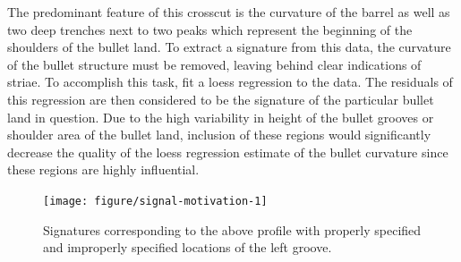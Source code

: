 \documentclass[12pt]{article}\usepackage[]{graphicx}\usepackage[]{color}
\newenvironment{knitrout}{}{} %
\theoremstyle{nonumberplain}
\begin{document}
The predominant feature of this crosscut is the curvature of the barrel as well as two deep trenches next to two peaks which represent the beginning of the shoulders of the bullet land. To extract a signature from this data, the curvature of the bullet structure must be removed, leaving behind clear indications of striae. To accomplish this task, \cite{hare2017} fit a loess regression to the data. The residuals of this regression are then considered to be the signature of the particular bullet land in question. Due to the high variability in height of the bullet grooves or shoulder area of the bullet land, inclusion of these regions would significantly decrease the quality of the loess regression estimate of the bullet curvature since these regions are highly influential. 

\begin{knitrout}
\color{fgcolor}\begin{figure}[H]

{\centering \texttt{[image: figure/signal-motivation-1]} 

}

\caption[Signatures corresponding to the above profile with properly specified and improperly specified locations of the left groove]{Signatures corresponding to the above profile with properly specified and improperly specified locations of the left groove.}\label{fig:signal-motivation}
\end{figure}


\end{knitrout}

% 
% 
% 
% 
% 
% 
% 
% 
% 
% 
\end{document}
